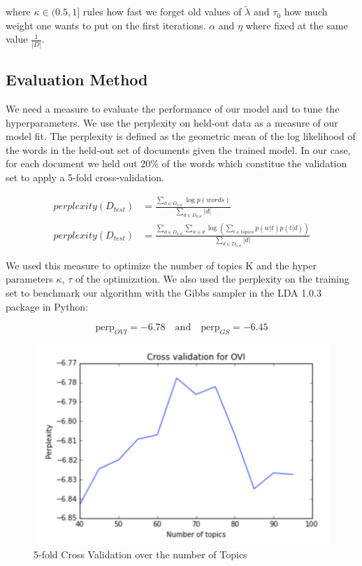 \documentclass[twoside]{article}
\begin{document}
\begin{multicols}{2}
\noindent where $\kappa \in (0.5,1]$ rules how fast we forget old values of $\tilde{\lambda}$ and $\tau_{0}$ how much weight one wants to put on the first iterations. $\alpha$ and $\eta$ where fixed at the same value $\frac{1}{|D|}$.

\subsection{Evaluation Method}

We need a measure to evaluate the performance of our model and to tune the hyperparameters. We use the perplexity on held-out data as a measure of our model fit. The perplexity is defined as the geometric mean of the log likelihood of the words in the held-out set of documents given the trained model. In our case, for each document we held out 20\% of the words which constitue the validation set to apply a 5-fold cross-validation.

\begin{align*}
	perplexity(D_{test}) & = \frac{\sum\limits_{d \in D_{test}} \log p(words)}{\sum\limits_{d \in D_{test}}|d|}\\
	perplexity(D_{test}) & = \frac{\sum\limits_{d \in D_{test}} \sum\limits_{w \in d} \log \left( \sum_{t \in topics} p(w|t)p(t|d) \right)}{\sum\limits_{d \in D_{test}}|d|}
\end{align*}

\noindent We used this measure to optimize the number of topics K and the hyper parameters $\kappa$, $\tau$ of the optimization. We also used the perplexity on the training set to benchmark our algorithm with the Gibbs sampler in the LDA 1.0.3 package in Python:

$$\text{perp}_{OVI} = -6.78 \quad \text{and} \quad \text{perp}_{GS} = -6.45$$

\begin{figure}[H]
\centering
\includegraphics[width=1\linewidth]{img/V.png}
\caption{5-fold Cross Validation over the number of Topics}
\end{figure}


\end{multicols}
\end{document}
